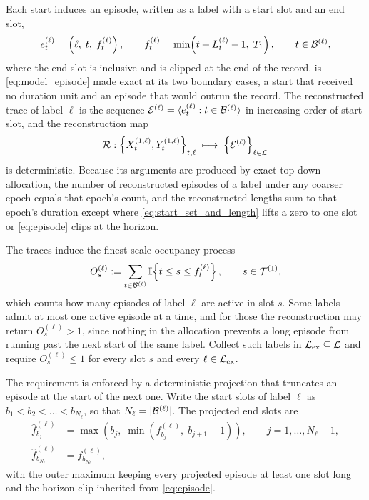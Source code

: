 Each start induces an episode, written as a label with a start slot and an end
slot,
\begin{align}
e_t^{(\ell)}
=
\left(
\ell, \;
t, \;
f_t^{(\ell)}
\right),
\qquad
f_t^{(\ell)} = \min\!\left( t + L_t^{(\ell)} - 1, \; T_1 \right),
\qquad t \in {\mathcal{B}}^{(\ell)},
\label{eq:episode}
\end{align}
where the end slot is inclusive and is clipped at the end of the record.
 is \cref{eq:model_episode} made exact at its two boundary
cases, a start that received no duration unit and an episode that would outrun
the record. The reconstructed trace of label $\ell$ is the sequence
${\mathcal{E}}^{(\ell)} = \langle e_t^{(\ell)} : t \in {\mathcal{B}}^{(\ell)} \rangle$ in
increasing order of start slot, and the reconstruction map
\begin{align}
{\mathcal{R}} :
\left\{ X_t^{(1,\ell)}, Y_t^{(1,\ell)} \right\}_{t,\ell}
\;\longmapsto\;
\left\{ {\mathcal{E}}^{(\ell)} \right\}_{\ell \in {\mathcal{L}}}
\label{eq:reconstruction_map}
\end{align}
is deterministic. Because its arguments are produced by exact top-down
allocation, the number of reconstructed episodes of a label under any coarser
epoch equals that epoch's count, and the reconstructed lengths sum to that
epoch's duration except where \cref{eq:start_set_and_length} lifts a zero to
one slot or \cref{eq:episode} clips at the horizon.

The traces induce the finest-scale occupancy process
\begin{align}
O_s^{(\ell)}
:=
\sum_{t \in {\mathcal{B}}^{(\ell)}}
\mathbb{I}\!\left\{ t \le s \le f_t^{(\ell)} \right\},
\qquad s \in {\mathcal{T}}^{(1)},
\label{eq:occupancy}
\end{align}
which counts how many episodes of label $\ell$ are active in slot $s$. Some
labels admit at most one active episode at a time, and for those the
reconstruction may return $O_s^{(\ell)} > 1$, since nothing in the allocation
prevents a long episode from running past the next start of the same label.
Collect such labels in ${\mathcal{L}}_{\mathrm{ex}} \subseteq {\mathcal{L}}$ and require
$O_s^{(\ell)} \le 1$ for every slot $s$ and every $\ell \in {\mathcal{L}}_{\mathrm{ex}}$.

The requirement is enforced by a deterministic projection that truncates an
episode at the start of the next one. Write the start slots of label $\ell$ as
$b_1 < b_2 < \dots < b_{N_\ell}$, so that $N_\ell = |{\mathcal{B}}^{(\ell)}|$. The
projected end slots are
\begin{align}
\hat{f}_{b_j}^{(\ell)}
&=
\max\!\left(
b_j, \;
\min\!\left( f_{b_j}^{(\ell)}, \; b_{j+1} - 1 \right)
\right),
\qquad j = 1,\dots,N_\ell-1,
\label{eq:exclusivity_projection}
\\
\hat{f}_{b_{N_\ell}}^{(\ell)}
&=
f_{b_{N_\ell}}^{(\ell)},
\label{eq:exclusivity_projection_last}
\end{align}
with the outer maximum keeping every projected episode at least one slot long
and the horizon clip inherited from \cref{eq:episode}.

